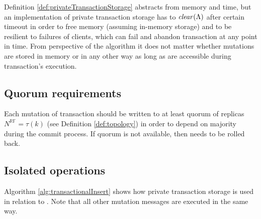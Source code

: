 Definition \ref{def:privateTransactionStorage} abstracts from memory and time, but an implementation of private transaction storage has to $\mathit{clear}(\text{$\Lambda$})$ after certain timeout in order to free memory (assuming in-memory storage) and to be resilient to failures of clients, which can fail and abandon transaction \transactionj at any point in time. From perspective of the algorithm it does not matter whether mutations \mutations are stored in memory or in any other way as long as \mutations are accessible during transaction's execution. 


\subsection{Quorum requirements}
Each mutation  of transaction \transactionj should be written to at least quorum of replicas $N^{\mathbb{RF}} = \tau(k)$ (see Definition \ref{def:topology}) in order to depend on majority during the commit process. If quorum is not available, then \transactionj needs to be rolled back. 

\subsection{Isolated operations}
Algorithm \ref{alg:transactionalInsert} shows how private transaction storage is used in relation to \insertMessage. Note that all other mutation messages are executed in the same way. 

 
 
